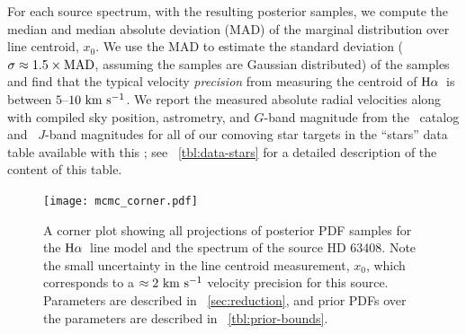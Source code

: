 \documentclass[modern, letterpaper]{aastex61}
\newcommand{\tgas}{\acronym{TGAS}}
\newcommand{\tmass}{\acronym{2MASS}}
\newcommand{\Ha}{\ensuremath{{\rm H}\alpha}}
\begin{document}
For each source spectrum, with the resulting posterior samples, we compute the
median and median absolute deviation (MAD) of the marginal distribution over
line centroid, $x_0$.
We use the MAD to estimate the standard deviation ($\sigma \approx 1.5\times{\rm
MAD}$, assuming the samples are Gaussian distributed) of the samples and find
that the typical velocity \emph{precision} from measuring the centroid of \Ha\
is between $5$--$10~\mathrm{km}~\mathrm{s}^{-1}$.
We report the measured absolute radial velocities along with compiled sky
position, astrometry, and $G$-band magnitude from the \tgas\ catalog and \tmass\
$J$-band magnitudes for all of our comoving star targets in the ``stars'' data
table available with this \documentname; see \tablename~\ref{tbl:data-stars} for
a detailed description of the content of this table.

\begin{figure}[!hp]
  \begin{center}
    \texttt{[image: mcmc\_corner.pdf]}
  \end{center}
  \caption{%
    A corner plot showing all projections of posterior PDF samples for the \Ha\
    line model and the spectrum of the source HD 63408.
    Note the small uncertainty in the line centroid measurement, $x_0$, which
    corresponds to a $\approx 2~\mathrm{km}~\mathrm{s}^{-1}$ velocity precision for this source.
    Parameters are described in \sectionname~\ref{sec:reduction}, and prior PDFs
    over the parameters are described in \tablename~\ref{tbl:prior-bounds}.
    \label{fig:Halpha-mcmc-corner}}
\end{figure}
\end{document}
